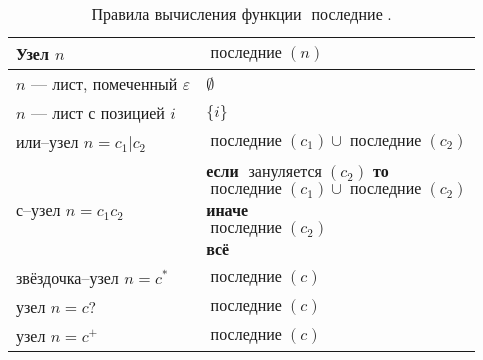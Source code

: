 \documentclass[10pt]{report}
\newcommand{\nullable}{\mathop{\textit{зануляется}}}
\newcommand{\lastpos}{\mathop{\textit{последние}}}
\begin{document}
\begin{table}[!h]
  \centering
  \caption{Правила вычисления функции $\lastpos$.}\label{last!table}
\begin{tabular}{|l|l|}  \hline
Узел $n$                                & $\lastpos(n)$                             \\  \hline
$n$ --- лист, помеченный $\varepsilon$  & $\emptyset$                               \\  \hline
$n$ --- лист с позицией $i$             & $\{i\}$                                   \\  \hline
или--узел $n=c_1|c_2$                   & $\lastpos(c_1)\cup\lastpos(c_2)$          \\  \hline
с--узел $n=c_1c_2$                      &
{\parbox[t]{60mm}{%
\textbf{если} $\nullable(c_2)$ \textbf{то}\\
\phantom{есл}$\lastpos(c_1)\cup\lastpos(c_2)$\\
\textbf{иначе}\\
\phantom{есл}$\lastpos(c_2)$\\
\textbf{всё}%
}}
\\  \hline
звёздочка--узел $n=c^*$                 & $\lastpos(c)$                             \\  \hline
узел $n=c?$                             & $\lastpos(c)$                          \\  \hline
узел $n=c^+$                            & $\lastpos(c)$                          \\  \hline
\end{tabular}
\end{table}
\end{document}
